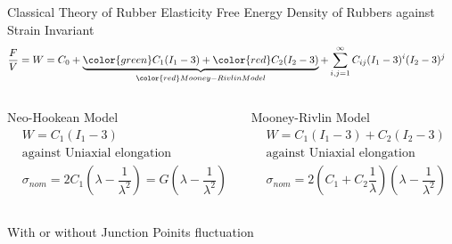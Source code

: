 \begin{columns}[totalwidth=.85\linewidth]
		\begin{itembox}[l]{Classical Theory of Rubber Elasticity}
				Free Energy Density of Rubbers against Strain Invariant
				\small
				\begin{align*}
					\dfrac{F}{V} = W 
					&= C_0 + \underbrace{{\color{green}C_1(I_1-3)} + {\color{red}C_2(I_2-3)}}_{\color{red}Mooney-Rivlin Model} + \sum_{i,j = 1}^{\infty} C_{ij}(I_1-3)^i(I_2-3)^j
				\end{align*}  
			\begin{columns}[T, onlytextwidth]
					\begin{itembox}{Neo-Hookean Model}
							\small
							\begin{align*}
								&W = C_1 (I_1-3) \\
								&\text{against Uniaxial elongation} \\
								&\sigma_{nom} = 2 C_1\left(\lambda - \dfrac{1}{\lambda^2}\right) = G \left(\lambda - \dfrac{1}{\lambda^2}\right)
							\end{align*}
					\end{itembox}
					\begin{itembox}{Mooney-Rivlin Model}
						\small
						\begin{align*}
							&W = C_1 (I_1-3) + C_2(I_2-3) \\
							&\text{against Uniaxial elongation} \\
							&\sigma_{nom} = 2 \left(C_1 + C_2\dfrac{1}{\lambda} \right) \left(\lambda - \dfrac{1}{\lambda^2}\right)
						\end{align*}
					\end{itembox}
			\end{columns}
			\begin{itembox}{With or without Junction Poinits fluctuation}
				\vspace{3mm}

\end{itembox}
\end{itembox}
\end{columns}
